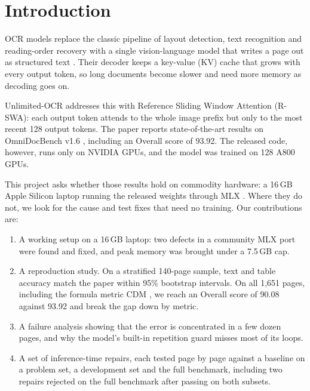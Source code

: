 \documentclass[journal]{IEEEtran}
\begin{document}
\IEEEpeerreviewmaketitle

\section{Introduction}

 OCR models replace the classic pipeline of layout
detection, text recognition and reading-order recovery with a single
vision-language model that writes a page out as structured text
\cite{blecher2023nougat,wei2024got,wei2025deepseekocr}. Their decoder keeps a
key-value (KV) cache that grows with every output token, so long documents
become slower and need more memory as decoding goes on.

Unlimited-OCR \cite{baidu2026unlimited} addresses this with Reference Sliding
Window Attention (R-SWA): each output token attends to the whole image prefix but
only to the most recent 128 output tokens. The paper reports state-of-the-art
results on OmniDocBench v1.6 \cite{ouyang2025omnidocbench}, including an Overall
score of 93.92. The released code, however, runs only on NVIDIA GPUs, and the
model was trained on 128 A800 GPUs.

This project asks whether those results hold on commodity hardware: a 16\,GB
Apple Silicon laptop running the released weights through MLX
\cite{hannun2023mlx}. Where they do not, we look for the cause and test fixes
that need no training. Our contributions are:

\begin{enumerate}
\item A working setup on a 16\,GB laptop: two defects in a community MLX port
were found and fixed, and peak memory was brought under a 7.5\,GB cap.
\item A reproduction study. On a stratified 140-page sample, text and table
accuracy match the paper within 95\% bootstrap intervals. On all 1,651 pages,
including the formula metric CDM \cite{wang2025cdm}, we reach an Overall score of
90.08 against 93.92 and break the gap down by metric.
\item A failure analysis showing that the error is concentrated in a few dozen
pages, and why the model's built-in repetition guard misses most of its loops.
\item A set of inference-time repairs, each tested page by page against a
baseline on a problem set, a development set and the full benchmark, including
two repairs rejected on the full benchmark after passing on both subsets.
\end{enumerate}
\end{document}
